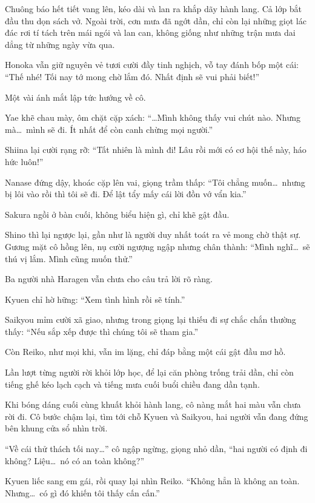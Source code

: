 \documentclass[../main.tex]{subfiles}
\begin{document}
\ct

Chuông báo hết tiết vang lên, kéo dài và lan ra khắp dãy hành lang. Cả lớp bắt đầu thu dọn sách vở. Ngoài trời, cơn mưa đã ngớt dần, chỉ còn lại những giọt lác đác rơi tí tách trên mái ngói và lan can, không giống như những trận mưa dai dẳng từ những ngày vừa qua.

Honoka vẫn giữ nguyên vẻ tươi cười đầy tinh nghịch, vỗ tay đánh bốp một cái: ``Thế nhé! Tối nay tớ mong chờ lắm đó. Nhất định sẽ vui phải biết!''

Một vài ánh mắt lập tức hướng về cô.

Yae khẽ chau mày, ôm chặt cặp xách: ``\dots Mình không thấy vui chút nào. Nhưng mà\dots\ mình sẽ đi. Ít nhất để còn canh chừng mọi người.''

Shiina lại cười rạng rỡ: ``Tất nhiên là mình đi! Lâu rồi mới có cơ hội thế này, háo hức luôn!''

Nanase đứng dậy, khoác cặp lên vai, giọng trầm thấp: ``Tôi chẳng muốn\dots\ nhưng bị lôi vào rồi thì tôi sẽ đi. Để lật tẩy mấy cái lời đồn vớ vẩn kia.''

Sakura ngồi ở bàn cuối, không biểu hiện gì, chỉ khẽ gật đầu.

Shino thì lại ngược lại, gần như là người duy nhất toát ra vẻ mong chờ thật sự. Gương mặt cô hồng lên, nụ cười ngượng ngập nhưng chân thành: ``Mình nghĩ\dots\ sẽ thú vị lắm. Mình cũng muốn thử.''

Ba người nhà Haragen vẫn chưa cho câu trả lời rõ ràng.

Kyuen chỉ hờ hững: ``Xem tình hình rồi sẽ tính.''

Saikyou mỉm cười xã giao, nhưng trong giọng lại thiếu đi sự chắc chắn thường thấy: ``Nếu sắp xếp được thì chúng tôi sẽ tham gia.''

Còn Reiko, như mọi khi, vẫn im lặng, chỉ đáp bằng một cái gật đầu mơ hồ.

Lần lượt từng người rời khỏi lớp học, để lại căn phòng trống trải dần, chỉ còn tiếng ghế kéo lạch cạch và tiếng mưa cuối buổi chiều đang dần tạnh.

Khi bóng dáng cuối cùng khuất khỏi hành lang, cô nàng mắt hai màu vẫn chưa rời đi. Cô bước chậm lại, tìm tới chỗ Kyuen và Saikyou, hai người vẫn đang đứng bên khung cửa sổ nhìn trời.

``Về cái thử thách tối nay\dots'' cô ngập ngừng, giọng nhỏ dần, ``hai người có định đi không? Liệu\dots\ nó có an toàn không?''

Kyuen liếc sang em gái, rồi quay lại nhìn Reiko. ``Không hẳn là không an toàn. Nhưng\dots\ có gì đó khiến tôi thấy cấn cấn.''
\end{document}
